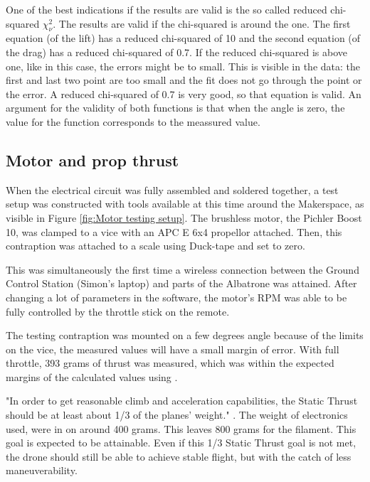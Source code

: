 One of the best indications if the results are valid is the so called reduced chi-squared $\chi_{\nu}^{2}$. The results are valid if the chi-squared is around the one. The first equation (of the lift) has a reduced chi-squared of 10 and the second equation (of the drag) has a reduced chi-squared of 0.7. If the reduced chi-squared is above one, like in this case, the errors might be to small. This is visible in the data: the first and last two point are too small and the fit does not go through the point or the error. A reduced chi-squared of 0.7 is very good, so that equation is valid. An argument for the validity of both functions is that when the angle is zero, the value for the function corresponds to the meassured value.

\subsection{Motor and prop thrust}
When the electrical circuit was fully assembled and soldered together, a test setup was constructed with tools available at this time around the Makerspace, as visible in Figure \ref{fig:Motor testing setup}. The brushless motor, the Pichler Boost 10, was clamped to a vice with an APC E 6x4 propellor attached. Then, this contraption was attached to a scale using Duck-tape and set to zero.

This was simultaneously the first time a wireless connection between the Ground Control Station (Simon's laptop) and parts of the Albatrone was attained. After changing a lot of parameters in the software, the motor's RPM was able to be fully controlled by the throttle stick on the remote.

The testing contraption was mounted on a few degrees angle because of the limits on the vice, the measured values will have a small margin of error. With full throttle, 393 grams of thrust was measured, which was within the expected margins of the calculated values using \cite{RCPlanes}. 

"In order to get reasonable climb and acceleration capabilities, the Static Thrust should be at least about 1/3 of the planes' weight." \cite{RCPlanes}. The weight of electronics used, were in on around 400 grams. This leaves 800 grams for the filament. This goal is expected to be attainable. Even if this 1/3 Static Thrust goal is not met, the drone should still be able to achieve stable flight, but with the catch of less maneuverability.

